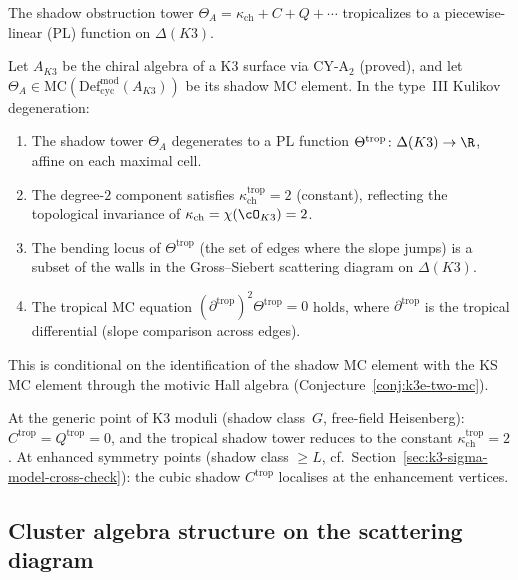The shadow obstruction tower $\Theta_A = \kappa_{\mathrm{ch}} + C + Q + \cdots$ tropicalizes to a piecewise-linear (PL) function on $\Delta(K3)$.

\begin{conjecture}
\label{conj:tropical-shadow}
\ClaimStatusConjectured
Let $A_{K3}$ be the chiral algebra of a K3 surface via CY-A$_2$ \textup{(}proved\textup{)}, and let $\Theta_A \in \mathrm{MC}(\mathrm{Def}_{\mathrm{cyc}}^{\mathrm{mod}}(A_{K3}))$ be its shadow MC element. In the type~III Kulikov degeneration:
\begin{enumerate}[label=\textup{(\roman*)}]
\item The shadow tower $\Theta_A$ degenerates to a PL function $\Theta^{\mathrm{trop}} \colon \Delta(K3) \to \R$, affine on each maximal cell.
\item The degree-$2$ component satisfies $\kappa_{\mathrm{ch}}^{\mathrm{trop}} = 2$ \textup{(}constant\textup{)}, reflecting the topological invariance of $\kappa_{\mathrm{ch}} = \chi(\cO_{K3}) = 2$.
\item The bending locus of $\Theta^{\mathrm{trop}}$ \textup{(}the set of edges where the slope jumps\textup{)} is a subset of the walls in the Gross--Siebert scattering diagram on $\Delta(K3)$.
\item The tropical MC equation $(\partial^{\mathrm{trop}})^2 \Theta^{\mathrm{trop}} = 0$ holds, where $\partial^{\mathrm{trop}}$ is the tropical differential \textup{(}slope comparison across edges\textup{)}.
\end{enumerate}
This is conditional on the identification of the shadow MC element with the KS MC element through the motivic Hall algebra \textup{(}Conjecture~\textup{\ref{conj:k3e-two-mc})}.
\end{conjecture}

At the generic point of K3 moduli \textup{(}shadow class~$G$, free-field Heisenberg\textup{)}: $C^{\mathrm{trop}} = Q^{\mathrm{trop}} = 0$, and the tropical shadow tower reduces to the constant $\kappa_{\mathrm{ch}}^{\mathrm{trop}} = 2$. At enhanced symmetry points \textup{(}shadow class $\geq L$, cf.\ Section~\ref{sec:k3-sigma-model-cross-check}\textup{)}: the cubic shadow $C^{\mathrm{trop}}$ localises at the enhancement vertices.

\subsection{Cluster algebra structure on the scattering diagram}
\label{subsec:tropical-cluster}

